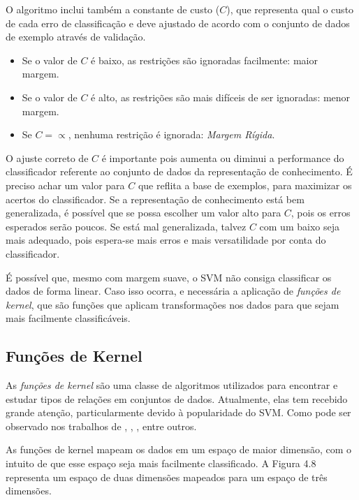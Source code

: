 O algoritmo inclui também a constante de custo ($C$), que representa qual o custo de cada erro de classificação e deve ajustado de acordo com o conjunto de dados de exemplo através de validação. 

\begin{itemize}
	\item Se o valor de $C$ é baixo, as restrições são ignoradas facilmente: maior margem.
	\item Se o valor de $C$ é alto, as restrições são mais difíceis de ser ignoradas: menor margem.
	\item Se $C = \propto$, nenhuma restrição é ignorada: \textit{Margem Rígida}.
\end{itemize}

O ajuste correto de $C$ é importante pois aumenta ou diminui a performance do classificador referente ao conjunto de dados da representação de conhecimento. É preciso achar um valor para $C$ que reflita a base de exemplos, para maximizar os acertos do classificador. Se a representação de conhecimento está bem generalizada, é possível que se possa escolher um valor alto para $C$, pois os erros esperados serão poucos. Se está mal generalizada, talvez $C$ com um baixo seja mais adequado, pois espera-se mais erros e mais versatilidade por conta do classificador.

É possível que, mesmo com margem suave, o SVM não consiga classificar os dados de forma linear. Caso isso ocorra, e necessária a aplicação de \textit{funções de kernel}, que são funções que aplicam transformações nos dados para que sejam mais facilmente classificáveis.

\subsection*{Funções de Kernel}

As \textit{funções de kernel} são uma classe de algoritmos utilizados para encontrar e estudar tipos de relações em conjuntos de dados. Atualmente, elas tem recebido grande atenção, particularmente devido à popularidade do SVM. Como pode ser observado nos trabalhos de , , , entre outros.

As funções de kernel mapeam os dados em um espaço de maior dimensão, com o intuito de que esse espaço seja mais facilmente classificado. A Figura 4.8 representa um espaço de duas dimensões mapeados para um espaço de três dimensões.

